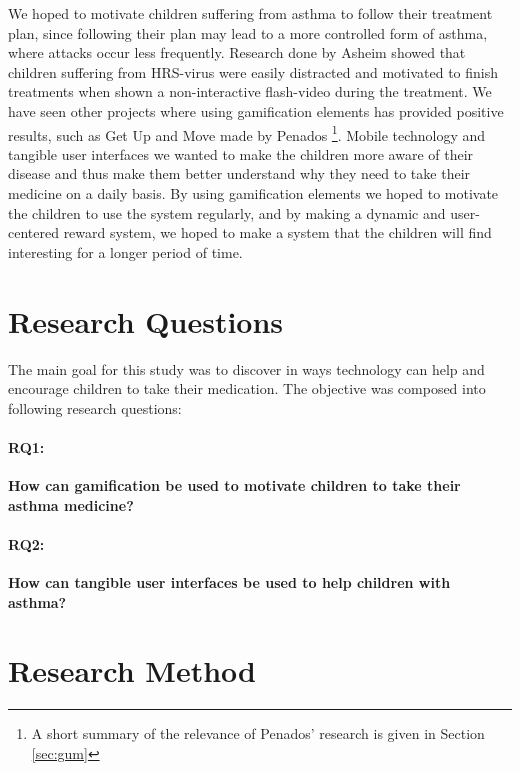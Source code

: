 We hoped to motivate children suffering from asthma to follow their treatment plan, since following their plan may lead to a more controlled form of asthma, where attacks occur less frequently\cite{ginasthma}. 
Research done by Asheim showed that children suffering from HRS-virus were easily distracted and motivated to finish treatments when shown a non-interactive flash-video during the treatment\cite{asheim2012konsept}. We have seen other projects where using gamification elements has provided positive results, such as Get Up and Move made by Penados \etal{}\cite{penadosget}\footnote{A short summary of the relevance of Penados' research is given in Section \ref{sec:gum}}. 
Mobile technology and tangible user interfaces we wanted to make the children more aware of their disease and thus make them better understand why they need to take their medicine on a daily basis. 
By using gamification elements we hoped to motivate the children to use the system regularly, and by making a dynamic and user-centered reward system, we hoped to make a system that the children will find interesting for a longer period of time.  



\section{Research Questions}
\label{sec:researchquestions}
The main goal for this study was to discover in ways technology can help and encourage children to take their medication. The objective was composed into following research questions: 

\paragraph{RQ1:}
\textbf{How can gamification be used to motivate children to take their asthma medicine?}


\paragraph{RQ2:}
\textbf{How can tangible user interfaces be used to help children with asthma?}


\section{Research Method}
\label{sec:researchmethod}


